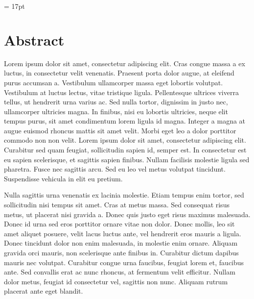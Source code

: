 \documentclass[11pt,oneside,openright]{book}
\begin{document}
\baselineskip = 17pt
\begin{titlepage}

\newpage
\thispagestyle{empty}
\end{titlepage}

\frontmatter

\tableofcontents
{}

\chapter{Abstract}

Lorem ipsum dolor sit amet, consectetur adipiscing elit. Cras congue massa a ex luctus, in consectetur velit venenatis. Praesent porta dolor augue, at eleifend purus accumsan a. Vestibulum ullamcorper massa eget lobortis volutpat. Vestibulum at luctus lectus, vitae tristique ligula. Pellentesque ultrices viverra tellus, ut hendrerit urna varius ac. Sed nulla tortor, dignissim in justo nec, ullamcorper ultricies magna. In finibus, nisi eu lobortis ultricies, neque elit tempus purus, sit amet condimentum lorem ligula id magna. Integer a magna at augue euismod rhoncus mattis sit amet velit. Morbi eget leo a dolor porttitor commodo non non velit. Lorem ipsum dolor sit amet, consectetur adipiscing elit. Curabitur sed quam feugiat, sollicitudin sapien id, semper est. In consectetur est eu sapien scelerisque, et sagittis sapien finibus. Nullam facilisis molestie ligula sed pharetra. Fusce nec sagittis arcu. Sed eu leo vel metus volutpat tincidunt. Suspendisse vehicula in elit eu pretium.

Nulla sagittis urna venenatis ex lacinia molestie. Etiam tempus enim tortor, sed sollicitudin nisi tempus sit amet. Cras at metus massa. Sed consequat risus metus, ut placerat nisi gravida a. Donec quis justo eget risus maximus malesuada. Donec id urna sed eros porttitor ornare vitae non dolor. Donec mollis, leo sit amet aliquet posuere, velit lacus luctus ante, vel hendrerit eros mauris a ligula. Donec tincidunt dolor non enim malesuada, in molestie enim ornare. Aliquam gravida orci mauris, non scelerisque ante finibus in. Curabitur dictum dapibus mauris nec volutpat. Curabitur congue urna faucibus, feugiat lorem et, faucibus ante. Sed convallis erat ac nunc rhoncus, at fermentum velit efficitur. Nullam dolor metus, feugiat id consectetur vel, sagittis non nunc. Aliquam rutrum placerat ante eget blandit.
\end{document}
